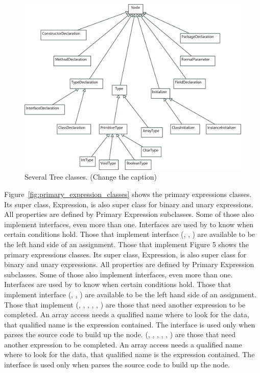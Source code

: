 \begin{figure}[!htb]
\begin{center}
\includegraphics[width=\textwidth]{images/several.eps}
\caption{Several Tree classes. (Change the caption)}
\label{fig:several_tree_classes}
\end{center}
\end{figure}

Figure~\ref{fig:primary_expression_classes} shows the primary
expressions classes. Its super class, Expression, is also super
class for binary and unary expressions. All properties are defined
by Primary Expression subclasses. Some of those also implement
interfaces, even more than one. Interfaces are used by \djava{} to
know when certain conditions hold. Those that implement
 interface (, ,
) are available to be the left hand side of an
assignment. Those that implement Figure 5 shows the primary
expressions classes. Its super class, Expression, is also super
class for binary and unary expressions. All properties are defined
by Primary Expression subclasses. Some of those also implement
interfaces, even more than one. Interfaces are used by \djava{} to
know when certain conditions hold. Those that implement
 interface (, ,
) are available to be the left hand side of an
assignment. Those that implement 
(, ,
, ,
, ) are those that need another
expression to be completed. An array access needs a qualified name
where to look for the data, that qualified name is the expression
contained. The interface  is used only when
\djava{} parses the source code to build up the 
node.  (,
, ,
, , ) are
those that need another expression to be completed. An array
access needs a qualified name where to look for the data, that
qualified name is the expression contained. The interface
 is used only when  parses
the source code to build up the  node.


